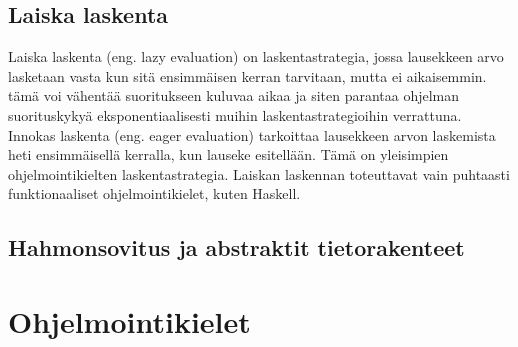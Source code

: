 \subsection{Laiska laskenta}
Laiska laskenta (eng. lazy evaluation) on laskentastrategia, jossa lausekkeen arvo lasketaan vasta kun sitä ensimmäisen
kerran tarvitaan, mutta ei aikaisemmin. tämä voi vähentää suoritukseen kuluvaa aikaa ja siten parantaa ohjelman
suorituskykyä eksponentiaalisesti muihin laskentastrategioihin verrattuna. Innokas laskenta (eng. eager evaluation)
tarkoittaa lausekkeen arvon laskemista heti ensimmäisellä kerralla, kun lauseke esitellään. Tämä on yleisimpien
ohjelmointikielten laskentastrategia. Laiskan laskennan toteuttavat vain puhtaasti funktionaaliset ohjelmointikielet,
kuten Haskell.\cite{languagedesign}


\subsection{Hahmonsovitus ja abstraktit tietorakenteet}


\section{Ohjelmointikielet}

